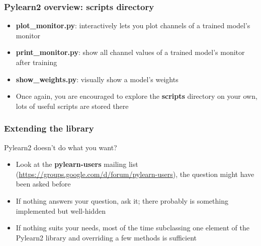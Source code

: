 \documentclass[mathserif, xcolor=dvipsnames]{beamer}
\begin{document}
\begin{frame}
    \frametitle{Pylearn2 overview: \textbf{scripts} directory}
    \Large
    \begin{itemize}\addtolength{\itemsep}{0.5\baselineskip}
        \item{\textbf{plot\_monitor.py}: interactively lets you plot channels of
              a trained model's monitor}
        \item{\textbf{print\_monitor.py}: show all channel values of a trained
              model's monitor after training}
        \item{\textbf{show\_weights.py}: visually show a model's weights}
        \item{Once again, you are encouraged to explore the \textbf{scripts}
              directory on your own, lots of useful scripts are stored there}
    \end{itemize}

\end{frame}

\begin{frame}
    \frametitle{Extending the library}
    \LARGE
    Pylearn2 doesn't do what you want?
    \begin{itemize}\addtolength{\itemsep}{0.5\baselineskip}
            \large
            \item{Look at the \textbf{pylearn-users} mailing list
                  (\url{https://groups.google.com/d/forum/pylearn-users}),
                  the question might have been asked before}
            \item{If nothing answers your question, ask it; there probably is
                  something implemented but well-hidden}
            \item{If nothing suits your needs, most of the time subclassing one
                  element of the Pylearn2 library and overriding a few methods
                  is sufficient}
    \end{itemize}

\end{frame}
\end{document}
